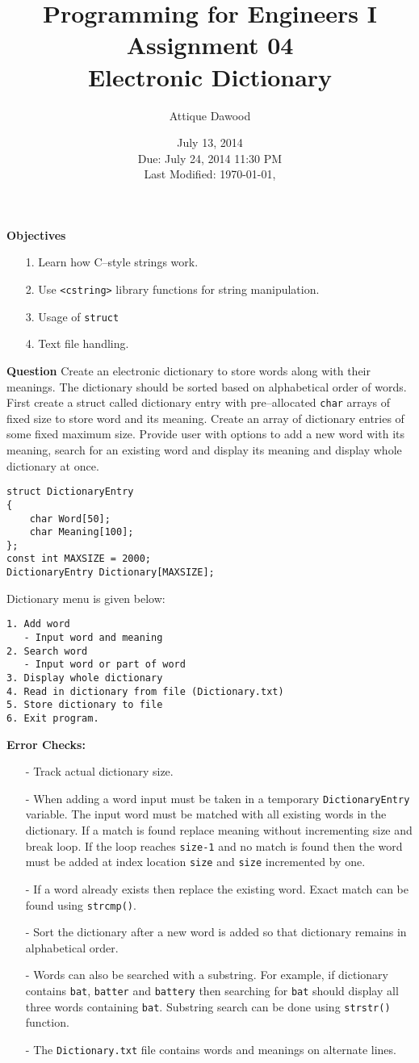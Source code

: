 \documentclass[12pt,a4paper]{article}
\title{Programming for Engineers I\\Assignment 04\\Electronic Dictionary}
\author{Attique Dawood}
\date{July 13, 2014\\Due: July 24, 2014 11:30 PM\\[0.2cm] Last Modified: \today, \currenttime}
\begin{document}
\maketitle
\noindent\textbf{Objectives}
\begin{itemize}
\item[1.] Learn how C--style strings work.
\item[2.] Use \verb|<cstring>| library functions for string manipulation.
\item[3.] Usage of \verb|struct|
\item[4.] Text file handling.
\end{itemize}
\noindent\textbf{Question} Create an electronic dictionary to store words along with their meanings. The dictionary should be sorted based on alphabetical order of words. First create a struct called dictionary entry with pre--allocated \verb|char| arrays of fixed size to store word and its meaning. Create an array of dictionary entries of some fixed maximum size. Provide user with options to add a new word with its meaning, search for an existing word and display its meaning and display whole dictionary at once.
\begin{verbatim}
struct DictionaryEntry
{
    char Word[50];
    char Meaning[100];
};
const int MAXSIZE = 2000;
DictionaryEntry Dictionary[MAXSIZE];
\end{verbatim}
Dictionary menu is given below:
\begin{verbatim}
1. Add word
   - Input word and meaning
2. Search word
   - Input word or part of word
3. Display whole dictionary
4. Read in dictionary from file (Dictionary.txt)
5. Store dictionary to file
6. Exit program.
\end{verbatim}
\noindent\textbf{Error Checks:}
\begin{itemize}
\item[-] Track actual dictionary size.
\item[-] When adding a word input must be taken in a temporary \verb|DictionaryEntry| variable. The input word must be matched with all existing words in the dictionary. If a match is found replace meaning without incrementing size and break loop. If the loop reaches \verb|size-1| and no match is found then the word must be added at index location \verb|size| and \verb|size| incremented by one.
\item[-] If a word already exists then replace the existing word. Exact match can be found using \verb|strcmp()|.
\item[-] Sort the dictionary after a new word is added so that dictionary remains in alphabetical order.
\item[-] Words can also be searched with a substring. For example, if dictionary contains \verb|bat|, \verb|batter| and \verb|battery| then searching for \verb|bat| should display all three words containing \verb|bat|. Substring search can be done using \verb|strstr()| function.
\item[-] The \verb|Dictionary.txt| file contains words and meanings on alternate lines.
\end{itemize}
\end{document}
